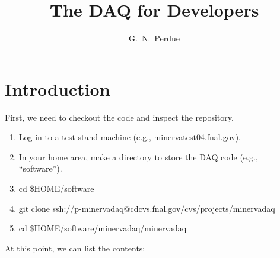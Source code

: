 



\linenumbers

\title{The \minerva DAQ for Developers}

\author[1]{G.~N.~Perdue}
\affil[1]{\Rochester}

\maketitle


\section{Introduction}
\label{sec:introduction}

First, we need to checkout the code and inspect the repository.
\begin{enumerate}
\item Log in to a test stand machine (e.g., minervatest04.fnal.gov). 
\item In your home area, make a directory to store the DAQ code (e.g., ``software'').
\item cd \$HOME/software
\item git clone ssh://p-minervadaq@cdcvs.fnal.gov/cvs/projects/minervadaq
\item cd \$HOME/software/minervadaq/minervadaq
\end{enumerate}

At this point, we can list the contents:

